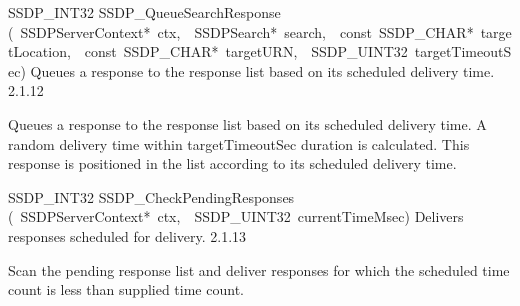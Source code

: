 \documentclass{article}
\begin{document}
\begin{cxxentry}
\begin{cxxentry}
\begin{cxxfunction}
\begin{cxxdoc}
\end{cxxdoc}
\end{cxxfunction}
\begin{cxxfunction}
{SSDP\_INT32}
        {SSDP\_QueueSearchResponse}
        {(\ SSDPServerContext*\ ctx,\ \ SSDPSearch*\ search,\ \ const\ SSDP\_CHAR*\ targetLocation,\ \ const\ SSDP\_CHAR*\ targetURN,\ \ SSDP\_UINT32\ targetTimeoutSec)}
        {Queues a response to the response list based on its scheduled delivery time.}
        {2.1.12}
\begin{cxxdoc}
Queues a response to the response list based on its scheduled delivery time.
A random delivery time within targetTimeoutSec duration is calculated.
This response is positioned in the list according to its scheduled delivery time.


\end{cxxdoc}
\end{cxxfunction}
\begin{cxxfunction}
{SSDP\_INT32}
        {SSDP\_CheckPendingResponses}
        {(\ SSDPServerContext*\ ctx,\ \ SSDP\_UINT32\ currentTimeMsec)}
        {Delivers responses scheduled for delivery. }
        {2.1.13}
\begin{cxxdoc}
Scan the pending response list and deliver responses for which the
scheduled time count is less than supplied time count.



\end{cxxdoc}
\end{cxxfunction}
\end{cxxentry}
\end{cxxentry}
\end{document}
